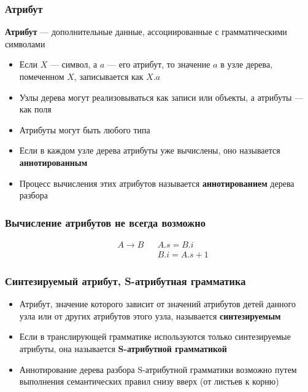 \documentclass{beamer}
\begin{document}
\begin{frame}[fragile]
  \transwipe[direction=90]
  \frametitle{Атрибут}

\begin{center}
    \textbf{Атрибут} --- дополнительные данные, ассоциированные с грамматическими символами
\end{center}
  \begin{itemize}
    \item Если $X$ --- символ, а $a$ --- его атрибут, то значение $a$ в узле дерева, помеченном $X$, записывается как $X.a$
    \item Узлы дерева могут реализовываться как записи или объекты, а атрибуты --- как поля
    \item Атрибуты могут быть любого типа 
    \item Если в каждом узле дерева атрибуты уже вычислены, оно называется \textbf{аннотированным}
    \item Процесс вычисления этих атрибутов называется \textbf{аннотированием} дерева разбора
  \end{itemize}
\end{frame}

\begin{frame}[fragile]
  \transwipe[direction=90]
  \frametitle{Вычисление атрибутов не всегда возможно}
$$
\begin{array}{clcl}
&A \rightarrow    B   & & A.s = B.i \\
&                     & & B.i = A.s + 1 
\end{array}
$$  
\end{frame}


\begin{frame}[fragile]
  \transwipe[direction=90]
  \frametitle{Синтезируемый атрибут, S-атрибутная грамматика}
  \begin{itemize}
    \item Атрибут, значение которого зависит от значений атрибутов детей данного узла или от других атрибутов этого узла, называется \textbf{синтезируемым}
    \item Если в транслирующей грамматике используются только синтезируемые атрибуты, она называется \textbf{S-атрибутной грамматикой}
    \item Аннотирование дерева разбора S-атрибутной грамматики возможно путем выполнения семантических правил снизу вверх (от листьев к корню)
  \end{itemize}    
  
\end{frame}
\end{document}
